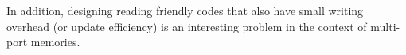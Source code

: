 \documentclass[11pt,letter]{article}
\newcommand{\Pc}{{\cal P}}
\newcommand\stext[1]{\footnotesize{#1}\normalsize}
\begin{document}
In addition, designing reading friendly codes that also have small writing overhead (or update efficiency) is an interesting problem in the context of multi-port memories.

\end{document}
